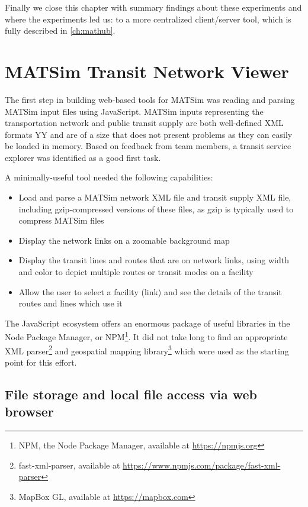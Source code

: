 Finally we close this chapter with summary findings about these experiments and where the experiments led us: to a more centralized client/server tool, which is fully described in \autoref{ch:mathub}.

\hypertarget{server-experiments-transit}{%
\section{MATSim Transit Network Viewer}\label{server-experiments-transit}}

The first step in building web-based tools for MATSim was reading and parsing MATSim input files using JavaScript. MATSim inputs representing the transportation network and public transit supply are both well-defined XML formats YY and are of a size that does not present problems as they can easily be loaded in memory. Based on feedback from team members, a transit service explorer was identified as a good first task.

A minimally-useful tool needed the following capabilities:

\begin{itemize}
  \tightlist
  \item
    Load and parse a MATSim network XML file and transit supply XML file, including gzip-compressed versions of these files, as gzip is typically used to compress MATSim files
  \item
    Display the network links on a zoomable background map
  \item
    Display the transit lines and routes that are on network links, using width and color to depict multiple routes or transit modes on a facility
  \item
    Allow the user to select a facility (link) and see the details of the transit routes and lines which use it
\end{itemize}

The JavaScript ecosystem offers an enormous package of useful libraries in the Node Package Manager, or NPM\footnote{NPM, the Node Package Manager, available at \url{https://npmjs.org}}. It did not take long to find an appropriate XML parser\footnote[1]{fast-xml-parser, available at \url{https://www.npmjs.com/package/fast-xml-parser}} and geospatial mapping library\footnote[2]{MapBox GL, available at \url{https://mapbox.com}} which were used as the starting point for this effort.

\hypertarget{server-experiments-files}{%
\subsection{File storage and local file access via web browser}
\label{server-experiments-files}}

